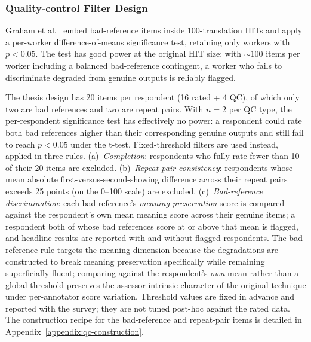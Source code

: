 \subsubsection{Quality-control Filter Design}
\label{sec:qc-filter-design}

Graham et al.\ \cite{Graham2017} embed bad-reference items inside 100-translation HITs and apply a per-worker difference-of-means significance test, retaining only workers with $p < 0.05$. The test has good power at the original HIT size: with $\sim 100$ items per worker including a balanced bad-reference contingent, a worker who fails to discriminate degraded from genuine outputs is reliably flagged.

The thesis design has 20 items per respondent (16 rated + 4 QC), of which only two are bad references and two are repeat pairs. With $n = 2$ per QC type, the per-respondent significance test has effectively no power: a respondent could rate both bad references higher than their corresponding genuine outputs and still fail to reach $p < 0.05$ under the t-test. Fixed-threshold filters are used instead, applied in three rules. (a)~\textit{Completion}: respondents who fully rate fewer than 10 of their 20 items are excluded. (b)~\textit{Repeat-pair consistency}: respondents whose mean absolute first-versus-second-showing difference across their repeat pairs exceeds 25 points (on the 0--100 scale) are excluded. (c)~\textit{Bad-reference discrimination}: each bad-reference's \textit{meaning preservation} score is compared against the respondent's own mean meaning score across their genuine items; a respondent both of whose bad references score at or above that mean is flagged, and headline results are reported with and without flagged respondents. The bad-reference rule targets the meaning dimension because the degradations are constructed to break meaning preservation specifically while remaining superficially fluent; comparing against the respondent's \textit{own} mean rather than a global threshold preserves the assessor-intrinsic character of the original technique under per-annotator score variation. Threshold values are fixed in advance and reported with the survey; they are not tuned post-hoc against the rated data. The construction recipe for the bad-reference and repeat-pair items is detailed in Appendix~\ref{appendix:qc-construction}.

\newpage
